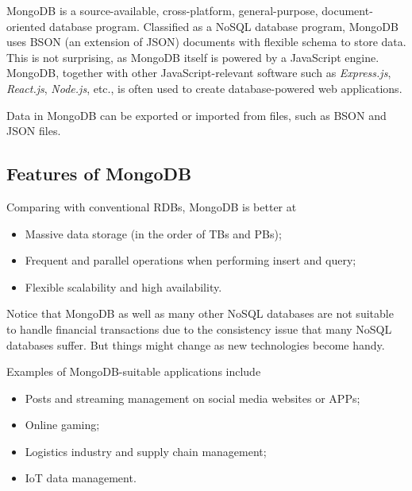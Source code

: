 MongoDB is a source-available, cross-platform, general-purpose, document-oriented database program. Classified as a NoSQL database program, MongoDB uses BSON (an extension of JSON) documents with flexible schema to store data. This is not surprising, as MongoDB itself is powered by a JavaScript engine. MongoDB, together with other JavaScript-relevant software such as \textit{Express.js}, \textit{React.js}, \textit{Node.js}, etc., is often used to create database-powered web applications.

Data in MongoDB can be exported or imported from files, such as BSON and JSON files.

\subsection{Features of MongoDB}

Comparing with conventional RDBs, MongoDB is better at
\begin{itemize}
	\item Massive data storage (in the order of TBs and PBs);
	\item Frequent and parallel operations when performing insert and query;
	\item Flexible scalability and high availability.
\end{itemize}
Notice that MongoDB as well as many other NoSQL databases are not suitable to handle financial transactions due to the consistency issue that many NoSQL databases suffer. But things might change as new technologies become handy.

Examples of MongoDB-suitable applications include
\begin{itemize}
	\item Posts and streaming management on social media websites or APPs;
	\item Online gaming;
	\item Logistics industry and supply chain management;
	\item IoT data management.
\end{itemize}

